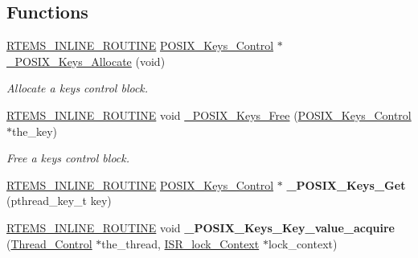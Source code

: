 \subsection*{Functions}
\begin{DoxyCompactItemize}
\item 
\mbox{\hyperlink{group__RTEMSScoreBaseDefs_gac216239df231d5dbd15e3520b0b9313f}{R\+T\+E\+M\+S\+\_\+\+I\+N\+L\+I\+N\+E\+\_\+\+R\+O\+U\+T\+I\+NE}} \mbox{\hyperlink{structPOSIX__Keys__Control}{P\+O\+S\+I\+X\+\_\+\+Keys\+\_\+\+Control}} $\ast$ \mbox{\hyperlink{group__POSIX__KEY_ga7a110714c13632b85ff13f72031a9f0f}{\+\_\+\+P\+O\+S\+I\+X\+\_\+\+Keys\+\_\+\+Allocate}} (void)
\begin{DoxyCompactList}\small\item\em Allocate a keys control block. \end{DoxyCompactList}\item 
\mbox{\hyperlink{group__RTEMSScoreBaseDefs_gac216239df231d5dbd15e3520b0b9313f}{R\+T\+E\+M\+S\+\_\+\+I\+N\+L\+I\+N\+E\+\_\+\+R\+O\+U\+T\+I\+NE}} void \mbox{\hyperlink{group__POSIX__KEY_gaca2350127d99f1a4dbc0f5e9bc012008}{\+\_\+\+P\+O\+S\+I\+X\+\_\+\+Keys\+\_\+\+Free}} (\mbox{\hyperlink{structPOSIX__Keys__Control}{P\+O\+S\+I\+X\+\_\+\+Keys\+\_\+\+Control}} $\ast$the\+\_\+key)
\begin{DoxyCompactList}\small\item\em Free a keys control block. \end{DoxyCompactList}\item 
\mbox{\label{group__POSIX__KEY_ga8d47bd5ba7a91092f4df03fc2f22c593}} 
\mbox{\hyperlink{group__RTEMSScoreBaseDefs_gac216239df231d5dbd15e3520b0b9313f}{R\+T\+E\+M\+S\+\_\+\+I\+N\+L\+I\+N\+E\+\_\+\+R\+O\+U\+T\+I\+NE}} \mbox{\hyperlink{structPOSIX__Keys__Control}{P\+O\+S\+I\+X\+\_\+\+Keys\+\_\+\+Control}} $\ast$ {\bfseries \+\_\+\+P\+O\+S\+I\+X\+\_\+\+Keys\+\_\+\+Get} (pthread\+\_\+key\+\_\+t key)
\item 
\mbox{\label{group__POSIX__KEY_ga808a76062582db81914888ba916c10db}} 
\mbox{\hyperlink{group__RTEMSScoreBaseDefs_gac216239df231d5dbd15e3520b0b9313f}{R\+T\+E\+M\+S\+\_\+\+I\+N\+L\+I\+N\+E\+\_\+\+R\+O\+U\+T\+I\+NE}} void {\bfseries \+\_\+\+P\+O\+S\+I\+X\+\_\+\+Keys\+\_\+\+Key\+\_\+value\+\_\+acquire} (\mbox{\hyperlink{struct__Thread__Control}{Thread\+\_\+\+Control}} $\ast$the\+\_\+thread, \mbox{\hyperlink{structISR__lock__Context}{I\+S\+R\+\_\+lock\+\_\+\+Context}} $\ast$lock\+\_\+context)

\end{DoxyCompactItemize}
